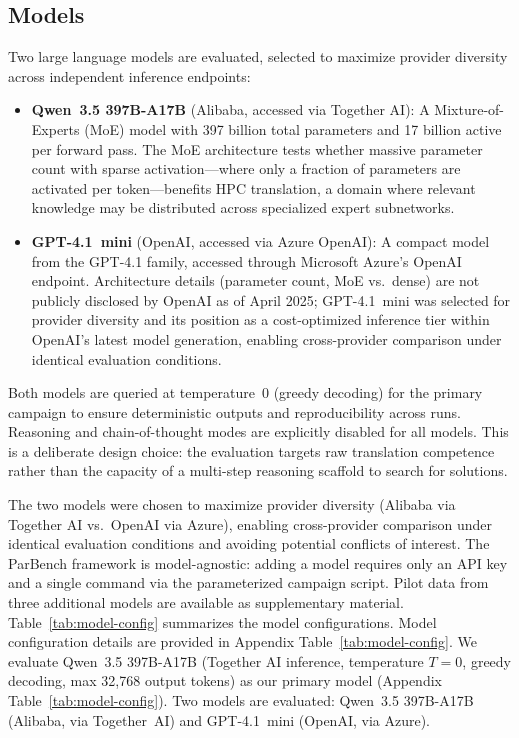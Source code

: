 \documentclass[conference]{IEEEtran}
\begin{document}
\subsection{Models}
\label{sec:models}

Two large language models are evaluated, selected to maximize provider diversity across independent inference endpoints:

\begin{itemize}
\item \textbf{Qwen~3.5 397B-A17B} (Alibaba, accessed via Together AI): A Mixture-of-Experts (MoE) model with 397 billion total parameters and 17 billion active per forward pass. The MoE architecture tests whether massive parameter count with sparse activation---where only a fraction of parameters are activated per token---benefits HPC translation, a domain where relevant knowledge may be distributed across specialized expert subnetworks.

\item \textbf{GPT-4.1~mini} (OpenAI, accessed via Azure OpenAI): A compact model from the GPT-4.1 family, accessed through Microsoft Azure's OpenAI endpoint. Architecture details (parameter count, MoE vs.\ dense) are not publicly disclosed by OpenAI as of April 2025; GPT-4.1~mini was selected for provider diversity and its position as a cost-optimized inference tier within OpenAI's latest model generation, enabling cross-provider comparison under identical evaluation conditions.
\end{itemize}

Both models are queried at temperature~0 (greedy decoding) for the primary campaign to ensure deterministic outputs and reproducibility across runs. Reasoning and chain-of-thought modes are explicitly disabled for all models. This is a deliberate design choice: the evaluation targets raw translation competence rather than the capacity of a multi-step reasoning scaffold to search for solutions.

The two models were chosen to maximize provider diversity (Alibaba via Together AI vs.\ OpenAI via Azure), enabling cross-provider comparison under identical evaluation conditions and avoiding potential conflicts of interest. The ParBench framework is model-agnostic: adding a model requires only an API key and a single command via the parameterized campaign script. Pilot data from three additional models are available as supplementary material. Table~\ref{tab:model-config} summarizes the model configurations.
Model configuration details are provided in Appendix Table~\ref{tab:model-config}.
We evaluate Qwen~3.5 397B-A17B (Together AI inference, temperature $T=0$,
greedy decoding, max 32{,}768 output tokens) as our primary model
(Appendix Table~\ref{tab:model-config}).
Two models are evaluated: Qwen~3.5 397B-A17B (Alibaba, via Together~AI) and GPT-4.1~mini (OpenAI, via Azure).
\end{document}
